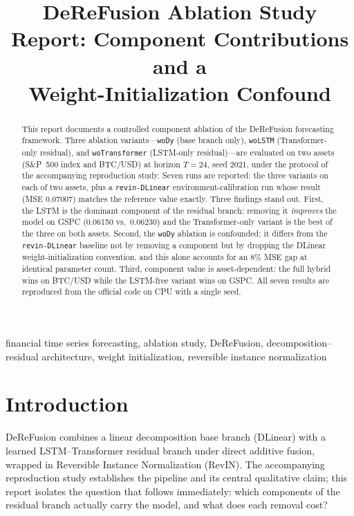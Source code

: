 \documentclass[conference]{IEEEtran}
\begin{document}
\title{DeReFusion Ablation Study Report: Component Contributions and a\\
Weight-Initialization Confound}

\author{
}

\maketitle

\begin{abstract}
This report documents a controlled component ablation of the DeReFusion
forecasting framework. Three ablation variants---\texttt{woDy} (base branch
only), \texttt{woLSTM} (Transformer-only residual), and
\texttt{woTransformer} (LSTM-only residual)---are evaluated on two assets
(S\&P~500 index and BTC/USD) at horizon $T{=}24$, seed 2021, under the
protocol of the accompanying reproduction study. Seven runs are reported:
the three variants on each of two assets, plus a \texttt{revin-DLinear}
environment-calibration run whose result (MSE 0.07007) matches the reference
value exactly. Three findings stand out. First, the LSTM is the dominant
component of the residual branch: removing it \emph{improves} the model on
GSPC (0.06150 vs.\ 0.06230) and the Transformer-only variant is the best of
the three on both assets. Second, the \texttt{woDy} ablation is confounded:
it differs from the \texttt{revin-DLinear} baseline not by removing a
component but by dropping the DLinear weight-initialization convention, and
this alone accounts for an 8\% MSE gap at identical parameter count. Third,
component value is asset-dependent: the full hybrid wins on BTC/USD while
the LSTM-free variant wins on GSPC. All seven results are reproduced from
the official code on CPU with a single seed.
\end{abstract}

\begin{IEEEkeywords}
financial time series forecasting, ablation study, DeReFusion,
decomposition--residual architecture, weight initialization,
reversible instance normalization
\end{IEEEkeywords}

\section{Introduction}

DeReFusion combines a linear decomposition base branch (DLinear) with a
learned LSTM--Transformer residual branch under direct additive fusion,
wrapped in Reversible Instance Normalization (RevIN). The accompanying
reproduction study establishes the pipeline and its central qualitative
claim; this report isolates the question that follows immediately: which
components of the residual branch actually carry the model, and what does
each removal cost?
\end{document}
